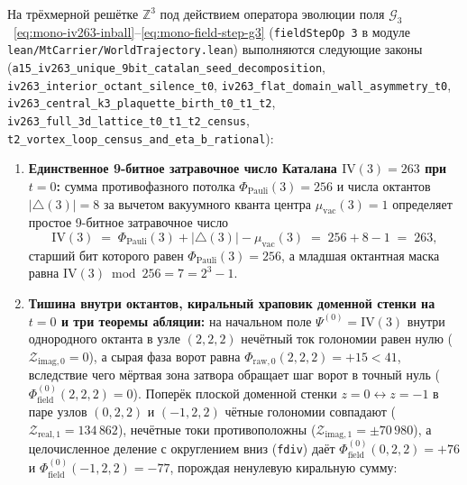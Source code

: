 \begin{theorem}[Затравочное состояние Каталана $\mathrm{IV}(3) = 263$, первое рождение вихря на такте $t = 2$, три теоремы абляции, бариогенезис $\eta_B$ и первичный нуклеосинтез $Y_p = 45/182$]
\label{thm:mono-first-vortex-birth-iv263}
На трёхмерной решётке $\mathbb{Z}^3$ под действием оператора эволюции поля $\mathcal{G}_3$~\eqref{eq:mono-iv263-inball}--\eqref{eq:mono-field-step-g3} (\texttt{fieldStepOp 3} в модуле \texttt{lean/MtCarrier/WorldTrajectory.lean}) выполняются следующие законы (\texttt{a15\_\allowbreak iv263\_\allowbreak unique\_\allowbreak 9bit\_\allowbreak catalan\_\allowbreak seed\_\allowbreak decomposition}, \texttt{iv263\_\allowbreak interior\_\allowbreak octant\_\allowbreak silence\_\allowbreak t0}, \texttt{iv263\_\allowbreak flat\_\allowbreak domain\_\allowbreak wall\_\allowbreak asymmetry\_\allowbreak t0}, \texttt{iv263\_\allowbreak central\_\allowbreak k3\_\allowbreak plaquette\_\allowbreak birth\_\allowbreak t0\_\allowbreak t1\_\allowbreak t2}, \texttt{iv263\_\allowbreak full\_\allowbreak 3d\_\allowbreak lattice\_\allowbreak t0\_\allowbreak t1\_\allowbreak t2\_\allowbreak census}, \texttt{t2\_\allowbreak vortex\_\allowbreak loop\_\allowbreak census\_\allowbreak and\_\allowbreak eta\_\allowbreak b\_\allowbreak rational}):
\begin{enumerate}[label=\textbf{(\arabic*)},leftmargin=*]
\item \textbf{Единственное 9-битное затравочное число Каталана $\mathrm{IV}(3) = 263$ при $t = 0$:}
  сумма противофазного потолка $\Phi_{\mathrm{Pauli}}(3) = 256$ и числа октантов $|{\triangle}(3)| = 8$ за вычетом вакуумного кванта центра $\mu_{\mathrm{vac}}(3) = 1$ определяет простое 9-битное затравочное число
  \begin{equation}
    \label{eq:mono-iv263-seed-def}
    \mathrm{IV}(3) \;=\; \Phi_{\mathrm{Pauli}}(3) + |{\triangle}(3)| - \mu_{\mathrm{vac}}(3) \;=\; 256 + 8 - 1 \;=\; 263,
  \end{equation}
  старший бит которого равен $\Phi_{\mathrm{Pauli}}(3) = 256$, а младшая октантная маска равна $\mathrm{IV}(3) \bmod 256 = 7 = 2^3 - 1$.
\item \textbf{Тишина внутри октантов, киральный храповик доменной стенки на $t = 0$ и три теоремы абляции:}
  на начальном поле $\Psi^{(0)} = \mathrm{IV}(3)$ внутри однородного октанта в узле $(2, 2, 2)$ нечётный ток голономии равен нулю ($\mathcal{Z}_{\mathrm{imag},0} = 0$), а сырая фаза ворот равна $\Phi_{\mathrm{raw},0}(2,2,2) = +15 < 41$, вследствие чего мёртвая зона затвора обращает шаг ворот в точный нуль ($\Phi_{\mathrm{field}}^{(0)}(2,2,2) = 0$). Поперёк плоской доменной стенки $z = 0 \leftrightarrow z = -1$ в паре узлов $(0, 2, 2)$ и $(-1, 2, 2)$ чётные голономии совпадают ($\mathcal{Z}_{\mathrm{real},1} = 134\,862$), нечётные токи противоположны ($\mathcal{Z}_{\mathrm{imag},1} = \pm 70\,980$), а целочисленное деление с округлением вниз (\texttt{fdiv}) даёт $\Phi_{\mathrm{field}}^{(0)}(0,2,2) = +76$ и $\Phi_{\mathrm{field}}^{(0)}(-1,2,2) = -77$, порождая ненулевую киральную сумму:

\end{enumerate}
\end{theorem}
